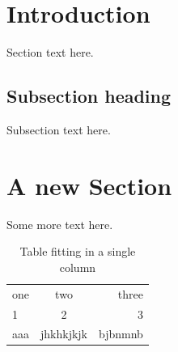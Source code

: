 \documentclass{sadhana}
\begin{document}


\section{Introduction}
Section text here.  
\subsection{Subsection heading}
Subsection text here. 


\section{A new Section}
Some more  text here.  


\begin{table}[htb]
\caption{Table fitting in a single column}\label{tableExample}
\begin{tabular}{|l|c|r|}
\hline
one& two &three\\
1&2&3\\
aaa&jhkhkjkjk& bjbnmnb\\
\hline
\end{tabular}
\end{table}






\end{document}

